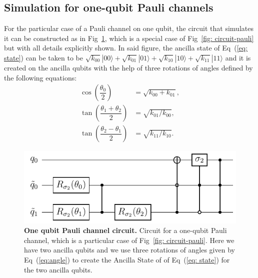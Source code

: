\documentclass[10pt,letterpaper]{article} %
\newcommand{\fref}[1]{Fig~\ref{#1}}
\newcommand{\eref}[1]{Eq~(\ref{#1})}
\begin{document}
\subsection{Simulation for one-qubit Pauli channels} %
\label{subsec: Simulation for one-qubit Pauli channels}

For the particular case of a Pauli channel on one qubit, the circuit that
simulates it can be constructed as in \fref{fig: circuit-pauli-1},
which is a special case of \fref{fig: circuit-pauli}
but with all details  explicitly shown.
In said figure, the ancilla state
of \eref{eq: state} can be taken to be
$\sqrt{k_{00}} |00\rangle + \sqrt{k_{01}} |01\rangle + \sqrt{k_{10}} 
|10\rangle + \sqrt{k_{11}}|11\rangle$
and it is created on the ancilla qubits with the help of three rotations of angles
defined by the following equations:
\begin{align}
\label{eq:angle}
\cos\left(\dfrac{\theta_0}{2} \right) &= \sqrt{k_{00} + k_{01}},\\
\tan\left( \dfrac{\theta_1 + \theta_2}{2} \right) &= \sqrt{k_{01}/k_{00}}, \\
\tan\left( \dfrac{\theta_2 - \theta_1}{2} \right) &= \sqrt{k_{11}/k_{10}}.
\end{align}

\begin{figure} %
\centering
\includegraphics{images/circuito_unqubit.pdf}
\caption{
{\bf One qubit Pauli channel circuit.} Circuit for a one-qubit Pauli channel,
which is a particular case of \fref{fig: circuit-pauli}.  Here we have two
ancilla qubits and we use three rotations
of angles given by \eref{eq:angle} to create the Ancilla State of
of \eref{eq: state} for the two ancilla qubits.
}
\label{fig: circuit-pauli-1} 
\end{figure} %


\end{document}
